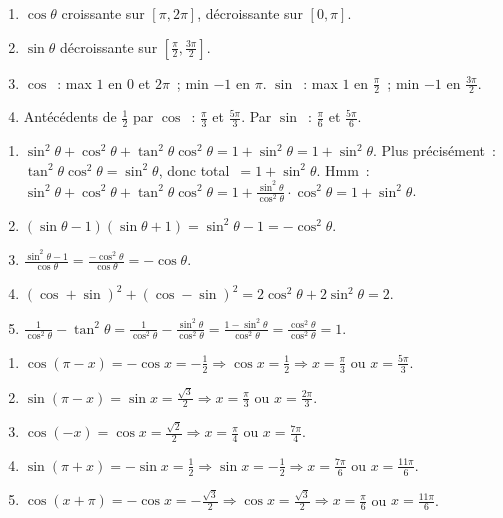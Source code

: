 
\begin{enumerate}
  \item $\cos\theta$ croissante sur $[\pi,2\pi]$, d\'ecroissante sur $[0,\pi]$.
  \item $\sin\theta$ d\'ecroissante sur $[\frac{\pi}{2},\frac{3\pi}{2}]$.
  \item $\cos$~: max $1$ en $0$ et $2\pi$~; min $-1$ en $\pi$.
        $\sin$~: max $1$ en $\frac{\pi}{2}$~; min $-1$ en $\frac{3\pi}{2}$.
  \item Ant\'ec\'edents de $\frac{1}{2}$ par $\cos$~: $\frac{\pi}{3}$ et $\frac{5\pi}{3}$.
        Par $\sin$~: $\frac{\pi}{6}$ et $\frac{5\pi}{6}$.
\end{enumerate}


\begin{enumerate}
  \item $\sin^2\theta+\cos^2\theta+\tan^2\theta\cos^2\theta=1+\sin^2\theta=1+\sin^2\theta$.
        Plus pr\'ecis\'ement~: $\tan^2\theta\cos^2\theta=\sin^2\theta$, donc total~$=1+\sin^2\theta$.
        Hmm~: $\sin^2\theta+\cos^2\theta+\tan^2\theta\cos^2\theta=1+\frac{\sin^2\theta}{\cos^2\theta}\cdot\cos^2\theta=1+\sin^2\theta$.
  \item $(\sin\theta-1)(\sin\theta+1)=\sin^2\theta-1=-\cos^2\theta$.
  \item $\frac{\sin^2\theta-1}{\cos\theta}=\frac{-\cos^2\theta}{\cos\theta}=-\cos\theta$.
  \item $(\cos+\sin)^2+(\cos-\sin)^2=2\cos^2\theta+2\sin^2\theta=2$.
  \item $\frac{1}{\cos^2\theta}-\tan^2\theta=\frac{1}{\cos^2\theta}-\frac{\sin^2\theta}{\cos^2\theta}=\frac{1-\sin^2\theta}{\cos^2\theta}=\frac{\cos^2\theta}{\cos^2\theta}=1$.
\end{enumerate}


\begin{enumerate}
  \item $\cos(\pi-x)=-\cos x=-\frac{1}{2}\Rightarrow\cos x=\frac{1}{2}\Rightarrow x=\frac{\pi}{3}$ ou $x=\frac{5\pi}{3}$.
  \item $\sin(\pi-x)=\sin x=\frac{\sqrt{3}}{2}\Rightarrow x=\frac{\pi}{3}$ ou $x=\frac{2\pi}{3}$.
  \item $\cos(-x)=\cos x=\frac{\sqrt{2}}{2}\Rightarrow x=\frac{\pi}{4}$ ou $x=\frac{7\pi}{4}$.
  \item $\sin(\pi+x)=-\sin x=\frac{1}{2}\Rightarrow\sin x=-\frac{1}{2}\Rightarrow x=\frac{7\pi}{6}$ ou $x=\frac{11\pi}{6}$.
  \item $\cos(x+\pi)=-\cos x=-\frac{\sqrt{3}}{2}\Rightarrow\cos x=\frac{\sqrt{3}}{2}\Rightarrow x=\frac{\pi}{6}$ ou $x=\frac{11\pi}{6}$.
\end{enumerate}

